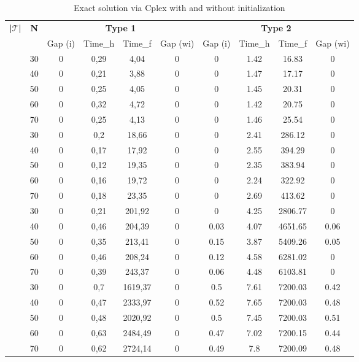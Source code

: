 \begin{table}[!h]
\caption{Exact solution via Cplex with and without initialization}
\centering
\tiny
\begin{tabular}{|c|c|c c c c|c c c c|}
\hline
\multirow{2}{*}{\textbf{|$\mathcal{T}$|}} & \multirow{2}{*}{\textbf{N}} & \multicolumn{4}{|c|}{\textbf{Type 1}} & \multicolumn{4}{|c|}{\textbf{Type 2}}\\
& &  Gap (i) & Time\_h  & Time\_f & Gap (wi) &  Gap (i) & Time\_h  & Time\_f & Gap (wi)\\
\hline
\multirow{5}{*}{\midrule 5} 
& 30 &	0 &	0,29 &	4,04 &	0 &	0 &	1.42 &	16.83 &	0\\
& 40 &	0 &	0,21 &	3,88 &	0 &	0 &	1.47 &	17.17 &	0\\ 
& 50 &	0 &	0,25 &	4,05 &	0 &	0 &	1.45 &	20.31 &	0\\
& 60 &	0 &	0,32 &	4,72 &	0 &	0 &	1.42 &	20.75 &	0\\
& 70 &	0 &	0,25 &	4,13 &	0 &	0 &	1.46 &	25.54 &	0\\
\hline
\multirow{5}{*}{\midrule 6} 
& 30 &	0 &	0,2 &	18,66 &	0 &	0 &	2.41 &	286.12 &	0\\
& 40 &	0 &	0,17 &	17,92 &	0 &	0 &	2.55 &	394.29 &	0\\
& 50 &	0 &	0,12 &	19,35 &	0 &	0 &	2.35 &	383.94 &	0\\
& 60 &	0 &	0,16 &	19,72 &	0 &	0 &	2.24 &	322.92 &	0\\
& 70 &	0 &	0,18 &	23,35 &	0 &	0 &	2.69 &	413.62 &	0\\
\hline
\multirow{5}{*}{\midrule 7} 
& 30 &	0 &	0,21 &	201,92 &	0 &	0 &	4.25 &	2806.77 &	0\\
& 40 &	0 &	0,46 &	204,39 &	0 &	0.03 &	4.07 &	4651.65 &	0.06\\
& 50 &	0 &	0,35 &	213,41 &	0 &	0.15 &	3.87 &	5409.26 &	0.05\\
& 60 &	0 &	0,46 &	208,24 &	0 &	0.12 &	4.58 &	6281.02 &	0\\
& 70 &	0 &	0,39 &	243,37 &	0 &	0.06 &	4.48 &	6103.81 &	0\\
\hline
\multirow{5}{*}{\midrule 8} 
& 30 &	0 &	0,7 &	1619,37 &	0 &	0.5  &	7.61 &	7200.03 &	0.42\\
& 40 &	0 &	0,47 &	2333,97 &	0 &	0.52 &	7.65 &	7200.03 &	0.48\\
& 50 &	0 &	0,48 &	2020,92 &	0 &	0.5  &	7.45 &	7200.03 &	0.51\\
& 60 &	0 &	0,63 &	2484,49 &	0 &	0.47 &	7.02 &	7200.15 &	0.44\\
& 70 &	0 &	0,62 &	2724,14 &	0 &	0.49 &	7.8 &	7200.09 &	0.48\\

\end{tabular}
\end{table}
